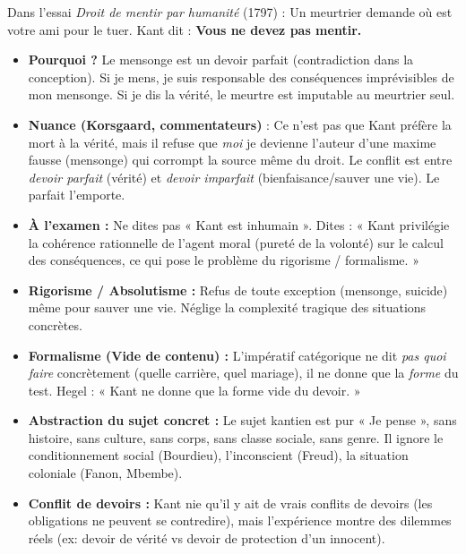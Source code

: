 \documentclass[11pt]{article}
\newcounter{popsec}
\newcounter{popsub}
\newcommand{\courssub}[1]{%
  \stepcounter{popsub}%
  \par\vspace{9pt}\noindent{\popxbold\fontsize{11.5}{13}\selectfont\color{popink}{\color{poporange}\thepopsec.\thepopsub}\hspace{6pt}#1}\par\nopagebreak\vspace{4pt}
}
\begin{document}
\courssub{Critiques classiques et réponses}

\begin{attention}
Dans l'essai \emph{Droit de mentir par humanité} (1797) : Un meurtrier demande où est votre ami pour le tuer. Kant dit : \textbf{Vous ne devez pas mentir.}
\begin{itemize}
    \item \textbf{Pourquoi ?} Le mensonge est un devoir parfait (contradiction dans la conception). Si je mens, je suis responsable des conséquences imprévisibles de mon mensonge. Si je dis la vérité, le meurtre est imputable au meurtrier seul.
    \item \textbf{Nuance (Korsgaard, commentateurs)} : Ce n'est pas que Kant préfère la mort à la vérité, mais il refuse que \emph{moi} je devienne l'auteur d'une maxime fausse (mensonge) qui corrompt la source même du droit. Le conflit est entre \emph{devoir parfait} (vérité) et \emph{devoir imparfait} (bienfaisance/sauver une vie). Le parfait l'emporte.
    \item \textbf{À l'examen :} Ne dites pas « Kant est inhumain ». Dites : « Kant privilégie la cohérence rationnelle de l'agent moral (pureté de la volonté) sur le calcul des conséquences, ce qui pose le problème du rigorisme / formalisme. »
\end{itemize}
\end{attention}

\begin{propriete}
\begin{itemize}
    \item \textbf{Rigorisme / Absolutisme :} Refus de toute exception (mensonge, suicide) même pour sauver une vie. Néglige la complexité tragique des situations concrètes.
    \item \textbf{Formalisme (Vide de contenu) :} L'impératif catégorique ne dit \emph{pas quoi faire} concrètement (quelle carrière, quel mariage), il ne donne que la \emph{forme} du test. Hegel : « Kant ne donne que la forme vide du devoir. »
    \item \textbf{Abstraction du sujet concret :} Le sujet kantien est pur « Je pense », sans histoire, sans culture, sans corps, sans classe sociale, sans genre. Il ignore le conditionnement social (Bourdieu), l'inconscient (Freud), la situation coloniale (Fanon, Mbembe).
    \item \textbf{Conflit de devoirs :} Kant nie qu'il y ait de vrais conflits de devoirs (les obligations ne peuvent se contredire), mais l'expérience montre des dilemmes réels (ex: devoir de vérité vs devoir de protection d'un innocent).
\end{itemize}
\end{propriete}
\end{document}
